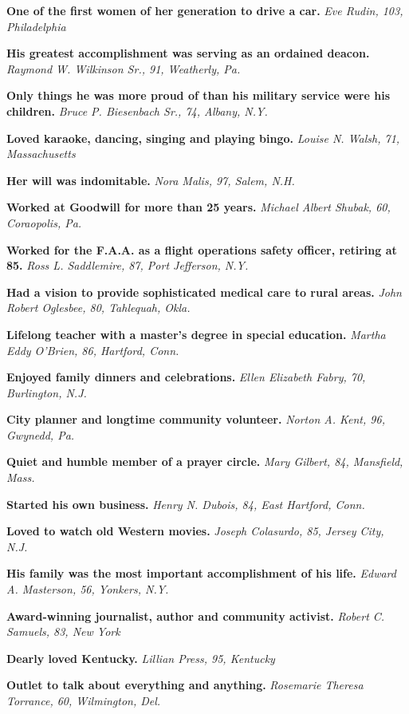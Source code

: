 \textbf{One of the first women of her generation to drive a car.}
\emph{Eve Rudin, 103, Philadelphia}

\textbf{His greatest accomplishment was serving as an ordained deacon.}
\emph{Raymond W. Wilkinson Sr., 91, Weatherly, Pa.}

\textbf{Only things he was more proud of than his military service were
his children.} \emph{Bruce P. Biesenbach Sr., 74, Albany, N.Y.}

\textbf{Loved karaoke, dancing, singing and playing bingo.} \emph{Louise
N. Walsh, 71, Massachusetts}

\textbf{Her will was indomitable.} \emph{Nora Malis, 97, Salem, N.H.}

\textbf{Worked at Goodwill for more than 25 years.} \emph{Michael Albert
Shubak, 60, Coraopolis, Pa.}

\textbf{Worked for the F.A.A. as a flight operations safety officer,
retiring at 85.} \emph{Ross L. Saddlemire, 87, Port Jefferson, N.Y.}

\textbf{Had a vision to provide sophisticated medical care to rural
areas.} \emph{John Robert Oglesbee, 80, Tahlequah, Okla.}

\textbf{Lifelong teacher with a master's degree in special education.}
\emph{Martha Eddy O'Brien, 86, Hartford, Conn.}

\textbf{Enjoyed family dinners and celebrations.} \emph{Ellen Elizabeth
Fabry, 70, Burlington, N.J.}

\textbf{City planner and longtime community volunteer.} \emph{Norton A.
Kent, 96, Gwynedd, Pa.}

\textbf{Quiet and humble member of a prayer circle.} \emph{Mary Gilbert,
84, Mansfield, Mass.}

\textbf{Started his own business.} \emph{Henry N. Dubois, 84, East
Hartford, Conn.}

\textbf{Loved to watch old Western movies.} \emph{Joseph Colasurdo, 85,
Jersey City, N.J.}

\textbf{His family was the most important accomplishment of his life.}
\emph{Edward A. Masterson, 56, Yonkers, N.Y.}

\textbf{Award-winning journalist, author and community activist.}
\emph{Robert C. Samuels, 83, New York}

\textbf{Dearly loved Kentucky.} \emph{Lillian Press, 95, Kentucky}

\textbf{Outlet to talk about everything and anything.} \emph{Rosemarie
Theresa Torrance, 60, Wilmington, Del.}

